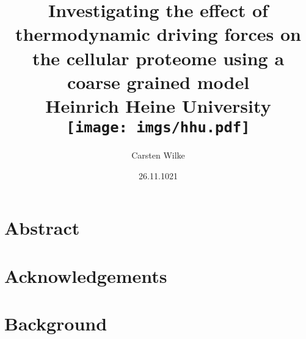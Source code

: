 \documentclass{report}
\title{
{Investigating the effect of thermodynamic driving forces on the cellular proteome using a coarse grained model}\\
{\large Heinrich Heine University}\\
{\texttt{[image: imgs/hhu.pdf]}}
}
\author{Carsten Wilke}
\date{26.11.1021}
\begin{document}
\maketitle

\chapter*{Abstract}


\chapter*{Acknowledgements}


\tableofcontents

\chapter{Background}




\end{document}
